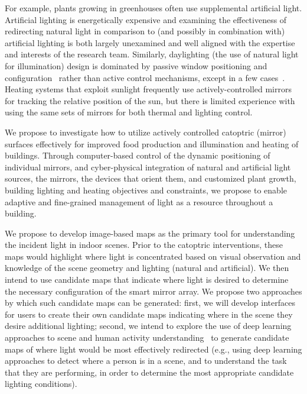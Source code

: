For example, plants growing in greenhouses often use supplemental artificial
light. Artificial lighting is energetically expensive and examining the
effectiveness of redirecting natural light in comparison to
(and possibly in combination with)
artificial lighting is both largely unexamined and well aligned with the
expertise and interests of the research team.
Similarly, daylighting (the use of natural light for illumination) design is
dominated by passive window positioning and configuration~\cite{vgf+13}
rather than
active control mechanisms, except in a few cases~\cite{kt16}.
Heating systems that
exploit sunlight frequently use actively-controlled mirrors for tracking the
relative position of the sun, but there is limited experience with using the
same sets of mirrors for both thermal and lighting control.

We propose to investigate how to utilize actively controlled catoptric (mirror)
surfaces effectively for improved food production and illumination and heating
of buildings. Through computer-based control of the dynamic positioning of
individual mirrors, and cyber-physical integration of natural and artificial
light sources, the mirrors, the devices that orient them, and customized plant
growth, building lighting and heating objectives and constraints, we propose to
enable adaptive and fine-grained management of light as a resource throughout a
building.

We propose to develop image-based maps as the primary tool for understanding
the incident light in indoor scenes. Prior to the catoptric interventions,
these maps would highlight where light is concentrated based on visual
observation and knowledge of the scene geometry and lighting (natural and
artificial). We then intend to use candidate maps that indicate where light is
desired to determine the necessary configuration of the smart mirror array. We
propose two approaches by which such candidate maps can be generated: first, we
will develop interfaces for users to create their own candidate maps indicating
where in the scene they desire additional lighting; second, we intend to
explore the use of deep learning approaches to scene and human activity
understanding~\cite{chao:wacv2018,Gkioxari_2018_CVPR,Redmon2015YouOL,Toshev_2014_CVPR}
to generate candidate maps of where light would be most
effectively redirected (e.g., using deep learning approaches to detect where a
person is in a scene, and to understand the task that they are performing, in
order to determine the most appropriate candidate lighting conditions).


